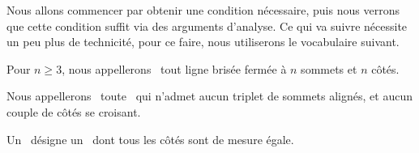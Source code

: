 Nous allons commencer par obtenir une condition nécessaire, puis nous verrons que cette condition suffit via des arguments d'analyse.
Ce qui va suivre nécessite un peu plus de technicité, pour ce faire, nous utiliserons le vocabulaire suivant.




\begin{defi}
	Pour $n \geq 3$, nous appellerons \og \emph{\nline} \fg\ tout ligne brisée fermée à $n$ sommets et $n$ côtés.
\end{defi}


\begin{defi}
	Nous appellerons \og \emph{\ngone} \fg\ toute \nline\ qui n'admet aucun triplet de sommets alignés, et aucun couple de côtés se croisant.
\end{defi}


\begin{defi}
	Un \og \emph{\niso} \fg\ désigne un \ngone\ dont tous les côtés sont de mesure égale.
\end{defi}
